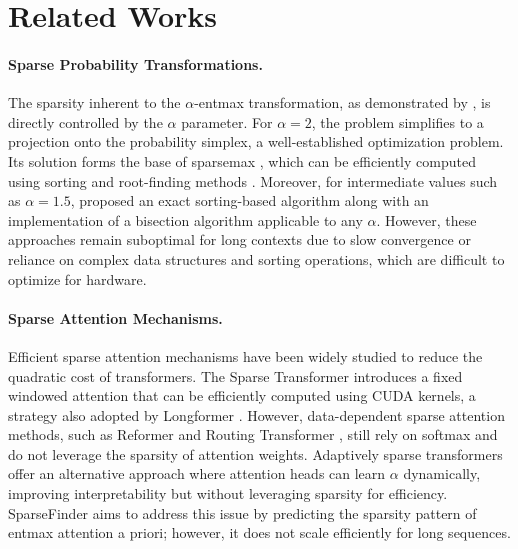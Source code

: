 \section{Related Works}
\paragraph{Sparse Probability Transformations.} 
The sparsity inherent to the $\alpha$-entmax transformation, as demonstrated by \citet{blondel-entmax}, is directly controlled by the $\alpha$ parameter. 
For $\alpha = 2$, the problem simplifies to a projection onto the probability simplex, a well-established optimization problem. Its solution forms the base of sparsemax \citep{martins2016softmax}, which can be efficiently computed using sorting and root-finding methods \citep{sort-and-scan,condats,ibis2009efficient}. 
Moreover, for intermediate values such as $\alpha=1.5$, \citet{peters-etal-2019-sparse} proposed an exact sorting-based algorithm along with an implementation of a bisection algorithm applicable to any $\alpha$.
However, these approaches remain suboptimal for long contexts due to slow convergence or reliance on complex data structures and sorting operations, which are difficult to optimize for hardware.

\paragraph{Sparse Attention Mechanisms.} Efficient sparse attention mechanisms have been widely studied to reduce the quadratic cost of transformers. The Sparse Transformer \citep{child_generating_2019} introduces a fixed windowed attention that can be efficiently computed using CUDA kernels, a strategy also adopted by Longformer \citep{Beltagy2020Longformer}. However, data-dependent sparse attention methods, such as Reformer \citep{kitaev2020reformer} and Routing Transformer \citep{roy2021efficient}, still rely on softmax and do not leverage the sparsity of attention weights.
Adaptively sparse transformers \citep{correia-etal-2019-adaptively} offer an alternative approach where attention heads can learn $\alpha$ dynamically, improving interpretability but without leveraging sparsity for efficiency. SparseFinder \citep{treviso-etal-2022-predicting} aims to address this issue by predicting the sparsity pattern of entmax attention a priori; however, it does not scale efficiently for long sequences.

